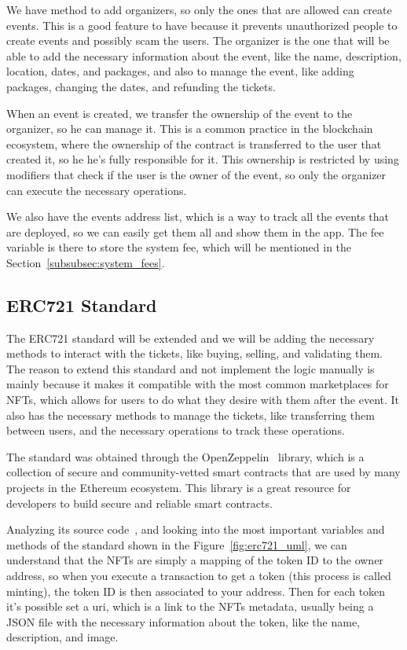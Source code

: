 We have method to add organizers, so only the ones that are allowed can create
events. This is a good feature to have because it prevents unauthorized people
to create events and possibly scam the users. The organizer is the one that
will be able to add the necessary information about the event, like the name,
description, location, dates, and packages, and also to manage the event, like
adding packages, changing the dates, and refunding the tickets.

When an event is created, we transfer the ownership of the event to the
organizer, so he can manage it. This is a common practice in the blockchain
ecosystem, where the ownership of the contract is transferred to the user that
created it, so he he's fully responsible for it. This ownership is restricted
by using modifiers that check if the user is the owner of the event, so only
the organizer can execute the necessary operations.

We also have the events address list, which is a way to track all the events
that are deployed, so we can easily get them all and show them in the app. The
fee variable is there to store the system fee, which will be mentioned in the
Section~\ref{subsubsec:system_fees}.

\subsection{ERC721 Standard}\label{subsec:erc721_standard}

The ERC721 standard will be extended and we will be adding the necessary
methods to interact with the tickets, like buying, selling, and validating
them. The reason to extend this standard and not implement the logic manually
is mainly because it makes it compatible with the most common marketplaces for
NFTs, which allows for users to do what they desire with them after the event.
It also has the necessary methods to manage the tickets, like transferring them
between users, and the necessary operations to track these operations.

The standard was obtained through the OpenZeppelin~\cite{openzeppelin} library,
which is a collection of secure and community-vetted smart contracts that are
used by many projects in the Ethereum ecosystem. This library is a great
resource for developers to build secure and reliable smart contracts.

Analyzing its source code~\cite{erc721}, and looking into the most important
variables and methods of the standard shown in the Figure~\ref{fig:erc721_uml},
we can understand that the NFTs are simply a mapping of the token ID to the
owner address, so when you execute a transaction to get a token (this process
is called minting), the token ID is then associated to your address. Then for
each token it's possible set a \gls{uri}, which is a link to the NFTs metadata,
usually being a JSON file with the necessary information about the token, like
the name, description, and image.

